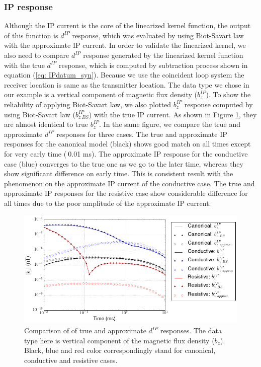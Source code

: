\documentclass[a4paper, 11pt]{article}
\newcommand{\dip}{d^{IP}}
\begin{document}
\clearpage

\subsubsection{IP response}
Although the IP current is the core of the linearized kernel function, the output of this function is $\dip$ response, which was evaluated by using Biot-Savart law with the approximate IP current. In order to validate the linearized kernel, we also need to compare $\dip$ response generated by the linearized kernel function with the true $\dip$ response, which is computed by subtraction process shown in equation (\ref{eq: IPdatum_syn}). Because we use the coincident loop system the receiver location is same as the transmitter location. The data type we chose in our example is a vertical component of magnetic flux density ($b^{IP}_z$). To show the reliability of applying Biot-Savart law, we also plotted $b^{IP}_z$ response computed by using Biot-Savart law ($b^{IP}_{z \ BS}$) with the true IP current. As shown in Figure \ref{F:compIPresp}, they are almost identical to true $b^{IP}_z$. In the same figure, we compare the true and approximate $\dip$ responses for three cases. The true and approximate IP responses for the canonical model (black) shows good match on all times except for very early time ($~$0.01 ms). The approximate IP response for the conductive case (blue)  converges to the true one as we go to the later time, whereas they show significant difference on early time. This is consistent result with the phenomenon on the approximate IP current of the conductive case. The true and approximate IP responses for the resistive case show considerable difference for all times due to the poor amplitude of the approximate IP current. 

\begin{figure}[htb]
  \centering  \includegraphics[width=1.0\textwidth]{figures/threecasesresp/compIPresp.png}
  \caption{Comparison of of true and approximate $\dip$ responses. The data type here is vertical component of the magnetic flux density ($b_z$). Black, blue and red color correspondingly stand for canonical, conductive and resistive cases. }
  \label{F:compIPresp}
\end{figure}
\clearpage
\end{document}
